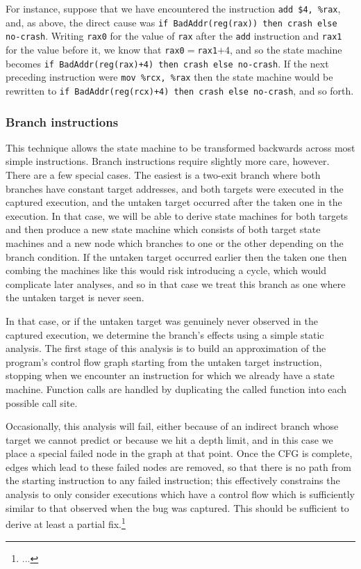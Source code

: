 \documentclass[10pt,twocolumn,preprint,natbib,authoryear]{sigplanconf}
\newcommand{\editorial}[1]{\textcolor{red}{\footnote{\textcolor{red}{#1}}}}
\begin{document}
For instance, suppose that we have encountered the instruction
\verb|add $4, %rax|, and, as above, the direct cause was
\verb|if BadAddr(reg(rax)) then crash else no-crash|.  Writing
\verb|rax0| for the value of \verb|rax| after the \verb|add|
instruction and \verb|rax1| for the value before it, we know that
\verb|rax0|$=$\verb|rax1|$+4$, and so the state machine becomes
\verb|if BadAddr(reg(rax)+4) then crash else no-crash|.  If the next
preceding instruction were \verb|mov %rcx, %rax| then the state
machine would be rewritten to
\verb|if BadAddr(reg(rcx)+4) then crash else no-crash|, and so forth.

\subsubsection{Branch instructions}
This technique allows the state machine to be transformed backwards
across most simple instructions.  Branch instructions require slightly
more care, however.  There are a few special cases.  The easiest is a
two-exit branch where both branches have constant target addresses,
and both targets were executed in the captured execution, and the
untaken target occurred after the taken one in the execution.  In that
case, we will be able to derive state machines for both targets and
then produce a new state machine which consists of both target state
machines and a new node which branches to one or the other depending
on the branch condition.  If the untaken target occurred earlier then
the taken one then combing the machines like this would risk
introducing a cycle, which would complicate later analyses, and so in
that case we treat this branch as one where the untaken target is
never seen.

In that case, or if the untaken target was genuinely never observed in
the captured execution, we determine the branch's effects using a
simple static analysis.  The first stage of this analysis is to build
an approximation of the program's control flow graph starting from the
untaken target instruction, stopping when we encounter an instruction
for which we already have a state machine.  Function calls are handled
by duplicating the called function into each possible call site.

Occasionally, this analysis will fail, either because of an indirect
branch whose target we cannot predict or because we hit a depth limit,
and in this case we place a special failed node in the graph at that
point.  Once the CFG is complete, edges which lead to these failed
nodes are removed, so that there is no path from the starting
instruction to any failed instruction; this effectively constrains the
analysis to only consider executions which have a control flow which
is sufficiently similar to that observed when the bug was captured.
This should be sufficient to derive at least a partial
fix.\editorial{...}
\end{document}
